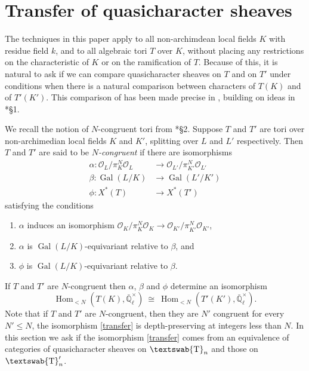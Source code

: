 \documentclass[11pt]{amsart}
\newcommand{\mathswab}[1]{\operatorname{\textswab{#1}}}
\theoremstyle{plain}
\theoremstyle{definition}
\theoremstyle{remark}
\newcommand{\EE}{\mathbb{\bar Q}_\ell}
\newcommand{\OK}{\mathcal{O}_K}
\newcommand{\OL}{\mathcal{O}_L}
\newcommand{\OO}[1]{\mathcal{O}_{#1}}
\newcommand{\EEx}{\EE^\times}
\DeclareMathOperator{\Gal}{Gal}
\DeclareMathOperator{\Hom}{Hom}
\newcommand{\iso}{{\ \cong\ }}
\newcommand{\GN}[1]{\mathswab{#1}}
\begin{document}
\section{Transfer of quasicharacter sheaves} \label{sec:transfer}

The techniques in this paper apply to all non-archimdean local fields $K$ with residue field $k$,
and to all algebraic tori $T$ over $K$, without placing any restrictions on the characteristic of $K$
or on the ramification of $T$. Because of this, it is natural to ask if we can compare
quasicharacter sheaves on $T$ and on $T'$ under conditions when there is a
natural comparison between characters of $T(K)$ and of $T'(K')$.
This comparison of has been made precise in \cite{chai-yu:01a}, 
building on ideas in \cite{deligne:84a}*{\S 1}. 

We recall the notion of $N$-congruent tori from  \cite{chai-yu:01a}*{\S 2}.
Suppose $T$ and $T'$ are tori over non-archimedian local fields $K$ and $K'$,
splitting over $L$ and $L'$ respectively.
Then $T$ and $T'$ are said to be \emph{$N$-congruent} if there are isomorphisms
 \begin{align*}
  \alpha : \OL/\pi_K^N \OL &\to \OO{L'}/\pi_{K'}^N \OO{L'} \\
  \beta : \Gal(L/K) &\to \Gal(L'/K') \\
  \phi : X^*(T) &\to X^*(T')
 \end{align*}
 satisfying the conditions
 \begin{enumerate}
  \item $\alpha$ induces an isomorphism $\OK/\pi_K^N \OK \to \OO{K'}/\pi_{K'}^N \OO{K'}$,
  \item $\alpha$ is $\Gal(L/K)$-equivariant relative to $\beta$, and
  \item $\phi$ is $\Gal(L/K)$-equivariant relative to $\beta$.
 \end{enumerate}
If $T$ and $T'$ are $N$-congruent then $\alpha$, $\beta$ and $\phi$ determine an isomorphism
\begin{equation}\label{transfer}
  \Hom_{<N}(T(K), \EEx) \iso \Hom_{<N}(T'(K'),\EEx).
\end{equation}
Note that if $T$ and $T'$ are $N$-congruent, then they are $N'$ congruent for every
$N' \leq N$, the isomorphism \eqref{transfer} is depth-preserving at integers less than $N$.
In this section we ask if the isomorphism \eqref{transfer} comes from an equivalence of
categories of quasicharacter sheaves on $\GN{T}_n$ and those on $\GN{T}'_n$.
\end{document}
